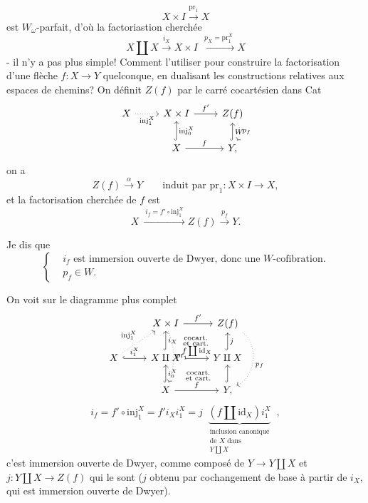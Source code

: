 \documentclass[11pt]{article}
\newcommand{\printedpage}[1]{\marginpar{\footnotesize p.~#1}}
\newcommand{\msp}[1]{\marginpar{\footnotesize [#1]}}
\begin{document}
\[
X \times I \xrightarrow{\mathrm{pr}_1} X
\]
est $W_\omega$-parfait, d'où la factoriastion cherchée %
\[
X \amalg X \xrightarrow{i_X} X \times I \ \xrightarrow{\ p_X = \mathrm{pr}_1^X\ } X
\]
- il n'y a pas plus simple! Comment l'utiliser pour construire la factorisation d'une flèche $f : X \longrightarrow Y$ quelconque, en dualisant les constructions relatives aux espaces de chemins? On définit $Z(f)$ par le carré cocartésien dans Cat
\[
\begin{tikzcd}
X \arrow[r, dotted, "\mathrm{inj}_1^X"'] & X \times I \arrow[r, "f'"] & Z(f) \arrow[d, dotted, bend left, "p_f"] \\
& X \arrow[u, hook, "\mathrm{inj}_0^X"'] \arrow[r, "f"] & Y, \arrow[u, hook, "W"']
\end{tikzcd}
\]
on a
\[
Z(f) \xrightarrow{\alpha} Y \qquad \text{induit par } \mathrm{pr}_1 : X \times I \longrightarrow X,
\]
et la factorisation cherchée de $f$ est
\[
X \ \xrightarrow{\ i_f = f' \circ \mathrm{inj}_1^X\ } Z(f) \xrightarrow{p_f} Y.
\]

Je dis que
\[
\left\{
\begin{aligned}
& i_f \text{ est immersion ouverte de Dwyer, donc une } W\text{-cofibration.} \\
& p_f \in W.
\end{aligned}
\right.
\]

\msp{page 230}
On voit sur le diagramme plus complet
\[
\begin{tikzcd}
& X \times I \arrow[r, "f'"] \arrow[dd, dotted, bend left=20, "\mathrm{pr}_1"] \arrow[dr, phantom, "\substack{\text{cocart.}\\ \text{et cart.}}"] & Z(f) \arrow[dd, dotted, bend left=60, "p_f"] \\
X \arrow[ur, dotted, "\mathrm{inj}_1^X"] \arrow[r, hook, "i_1^X"] & X \amalg X \arrow[u, hook, "i_X"'] \arrow[r, "f \coprod \mathrm{id}_X"] \arrow[dr, phantom, "\substack{\text{cocart.}\\ \text{et cart.}}"] & Y \amalg X \arrow[u, hook, "j"'] \\
& X \arrow[u, hook, "i_0^X"'] \arrow[r, "f"] & Y, \arrow[u, hook]
\end{tikzcd}
\]
\printedpage{147}
\[
i_f = f' \circ \mathrm{inj}_1^X = f' i_X i_1^X = j \ \ \underbrace{(f \amalg \mathrm{id}_X) i_1^X}_{\substack{\text{inclusion canonique}\\ \text{de } X \text{ dans}\\ Y \coprod X}} \ \ ,
\]
c'est immersion ouverte de Dwyer, comme composé de $Y \longrightarrow Y \amalg X$ et $j : Y \amalg X \longrightarrow Z(f)$ qui le sont ($j$ obtenu par cochangement de base à partir de $i_X$, qui est immersion ouverte de Dwyer).
\end{document}
